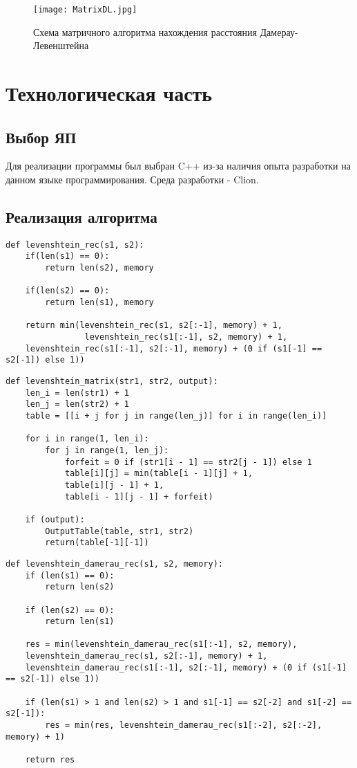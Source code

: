 \documentclass[12pt]{report}
\begin{document}
\begin{figure}[h]
\centering
\texttt{[image: MatrixDL.jpg]}
\caption{Схема матричного алгоритма нахождения расстояния Дамерау-Левенштейна}
\label{fig:mpr}
\end{figure}


\chapter{Технологическая часть}
\section{Выбор ЯП}
Для реализации программы был выбран C++ из-за наличия опыта разработки на данном языке программирования. Среда разработки - Clion.


\section{Реализация алгоритма}

\begin{lstlisting}[label=some-code,caption=Функция нахождения расстояния Левенштейна рекурсивно]
def levenshtein_rec(s1, s2):
	if(len(s1) == 0):
		return len(s2), memory
	
	if(len(s2) == 0):
		return len(s1), memory
	
	return min(levenshtein_rec(s1, s2[:-1], memory) + 1, 
				levenshtein_rec(s1[:-1], s2, memory) + 1, 
	levenshtein_rec(s1[:-1], s2[:-1], memory) + (0 if (s1[-1] == s2[-1]) else 1))
\end{lstlisting}


\begin{lstlisting}[label=some-code,caption=Функция нахождения расстояния Левенштейна матрично]
def levenshtein_matrix(str1, str2, output):
	len_i = len(str1) + 1
	len_j = len(str2) + 1
	table = [[i + j for j in range(len_j)] for i in range(len_i)]
	
	for i in range(1, len_i):
		for j in range(1, len_j):
			forfeit = 0 if (str1[i - 1] == str2[j - 1]) else 1
			table[i][j] = min(table[i - 1][j] + 1,
			table[i][j - 1] + 1,
			table[i - 1][j - 1] + forfeit)

	if (output):
		OutputTable(table, str1, str2)
		return(table[-1][-1])
\end{lstlisting}


\begin{lstlisting}[label=some-code,caption=Функция нахождения расстояния Дамерау-Левенштейна рекурсивно]
def levenshtein_damerau_rec(s1, s2, memory):
	if (len(s1) == 0):
		return len(s2)
	
	if (len(s2) == 0):
		return len(s1)
	
	res = min(levenshtein_damerau_rec(s1[:-1], s2, memory), 
	levenshtein_damerau_rec(s1, s2[:-1], memory) + 1,
	levenshtein_damerau_rec(s1[:-1], s2[:-1], memory) + (0 if (s1[-1] == s2[-1]) else 1))
	
	if (len(s1) > 1 and len(s2) > 1 and s1[-1] == s2[-2] and s1[-2] == s2[-1]):
		res = min(res, levenshtein_damerau_rec(s1[:-2], s2[:-2], memory) + 1)
	
	return res
\end{lstlisting}
\end{document}
